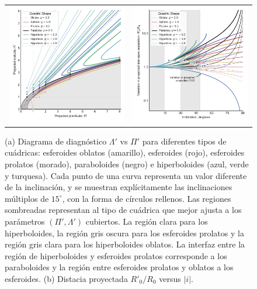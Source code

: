 \begin{figure}
  \centering
  \begin{tabular}{lr}
    \includegraphics[width=0.5\linewidth]{./Figures/projected-R90-vs-Rc} &
    \includegraphics[width=0.5\linewidth]{./Figures/projected-R0-vs-i}
  \end{tabular}
  \caption[Diagrama de diagnóstico $\Lambda'$ vs $\Pi'$ para diferentes tipos de cuádricas y distacia proyectada $R'_0/R_0$ versus $|i|$]{(a) Diagrama de diagnóstico $\Lambda'$ vs $\Pi'$ para diferentes tipos de cuádricas: esferoides oblatos (amarillo), esferoides (rojo), esferoides prolatos (morado), paraboloides (negro) e hiperboloides (azul, verde y turquesa). Cada punto de una curva representa un valor diferente de la inclinación, y se muestran explícitamente las inclinaciones múltiplos de $15^\circ$, con la forma de círculos rellenos. Las regiones sombreadas representan al tipo de cuádrica que mejor ajusta a los parámetros $(\Pi', \Lambda')$ cubiertos. La región clara para los hiperboloides, la región gris oscura para los esferoides prolatos y la región gris clara para los hiperboloides oblatos. La interfaz entre la región de hiperboloides y esferoides prolatos corresponde a los paraboloides y la región entre esferoides prolatos y oblatos a los esferoides. (b) Distacia proyectada $R'_0/R_0$ versus $|i|$.}
  \label{fig:Pip-Lambdap-diagnostic}
\end{figure}


